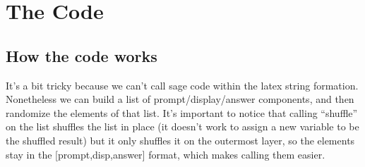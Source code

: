 \documentclass{ximera}
\begin{document}
\section{The Code}

    \subsection{How the code works}
        It's a bit tricky because we can't call sage code within the latex string formation. Nonetheless we can build a list of prompt/display/answer components, and then randomize the elements of that list. It's important to notice that calling ``shuffle'' on the list shuffles the list in place (it doesn't work to assign a new variable to be the shuffled result) but it only shuffles it on the outermost layer, so the elements stay in the [prompt,disp,answer] format, which makes calling them easier.
    
\end{document}
